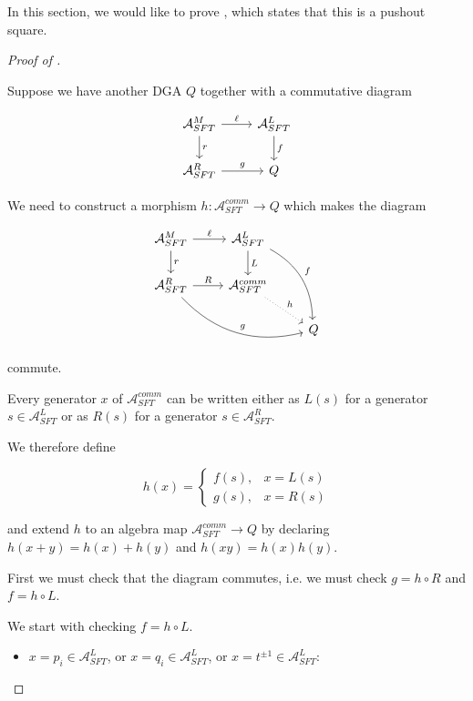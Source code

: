 \documentclass[a4paper,final, reqno]{amsart}
\theoremstyle{plain}
\theoremstyle{definition}
\newcommand{\A}{\mathcal{A}}
\begin{document}
		In this section, we would like to prove , which states that this is a pushout square.
		
		
		\begin{proof}[Proof of ] 
			
			
			\-\
			
			Suppose we have another DGA $Q$ together with a commutative diagram
			
			\[\begin{tikzcd}
				\A^M_{SFT} \arrow[r, "\ell"] \arrow[d, "r"] & \A^L_{SFT} \arrow[d, "f"] \\
				\A^R_{SFT} \arrow[r, "g"]           & Q
			\end{tikzcd} \]
			
			We need to construct a morphism $h: \A^{comm}_{SFT} \to Q$ which makes the diagram 
			
			\[\begin{tikzcd}
				\A^M_{SFT} \arrow[r, "\ell"] \arrow[d, "r"]          & \A^L_{SFT} \arrow[d, "L"] \arrow[rdd, bend left, "f"] &   \\
				\A^R_{SFT} \arrow[r, "R"] \arrow[rrd, bend right, "g"] & \A^{comm}_{SFT} \arrow[rd, dotted, "h"]               &   \\
				&                                    & Q
			\end{tikzcd} \]
			
			commute.
			
			
			Every generator $x$ of $\A^{comm}_{SFT}$ can be written either as $L(s)$ for a generator $s \in \A^L_{SFT}$ or as $R(s)$ for a generator $s \in \A^R_{SFT}$. 
			
			We therefore define
			
			\[ h(x) = \begin{cases}
				f(s), & x = L(s) \\
				g(s), & x = R(s) 
			\end{cases}\]
			
			and extend $h$ to an algebra map $\A^{comm}_{SFT} \to Q$ by declaring $h(x+y) = h(x)+h(y)$ and $h(xy) = h(x)h(y)$. 
			
			First we must check that the diagram commutes, i.e. we must check $g = h\circ R$ and $f = h\circ L$. 
			
			
			We start with checking $f=h\circ L$.
			\begin{itemize}
				\item $x=p_i \in \A^L_{SFT}$, or $x=q_i \in \A^L_{SFT}$, or $x=t^{\pm 1} \in\A^L_{SFT}$:
				

\end{itemize}
\end{proof}
\end{document}
